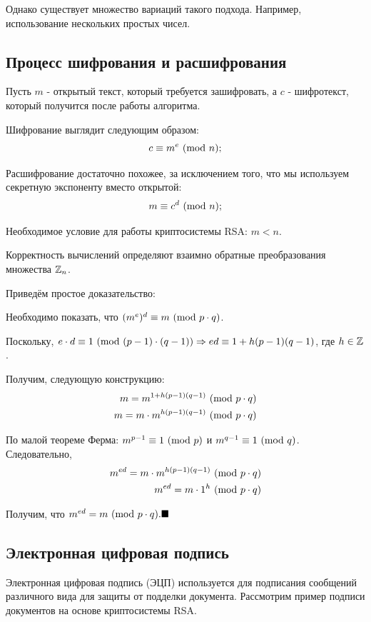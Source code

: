 Однако существует множество вариаций такого подхода. Например, использование нескольких простых чисел.

\subsection*{Процесс шифрования и расшифрования}

Пусть $m$ - открытый текст, который требуется зашифровать, а $c$ - шифротекст, который получится после работы алгоритма.

Шифрование выглядит следующим образом:
$$
c \equiv m^e \ (\mathrm{mod}\ n);
$$

Расшифрование достаточно похожее, за исключением того, что мы используем секретную экспоненту вместо открытой:
$$
m \equiv c^d \ (\mathrm{mod}\ n);
$$

Необходимое условие для работы криптосистемы RSA: $m < n$.

Корректность вычислений определяют взаимно обратные преобразования множества $\mathbb{Z}_n$.

Приведём простое доказательство:

Необходимо показать, что $(m^e)^d \equiv m \ (\mathrm{mod}\ p \cdot q)$.

Поскольку, $e \cdot d \equiv 1 \ (\mathrm{mod}\ (p-1) \cdot (q-1)) \Rightarrow ed \equiv 1 + h(p-1)(q-1)$, где $h \in \mathbb{Z}$.

Получим, следующую конструкцию:
\begin{align*}
    m = m^{1 + h(p-1)(q-1)} \ (\mathrm{mod}\ p \cdot q) \\
    m = m \cdot m^{h(p-1)(q-1)} \ (\mathrm{mod}\ p \cdot q)
\end{align*}

По малой теореме Ферма: $m^{p-1} \equiv 1 \ (\mathrm{mod}\ p)$ и $m^{q-1} \equiv 1 \ (\mathrm{mod}\ q)$. Следовательно,
\begin{align*}
    m^{ed} = m \cdot m^{h(p-1)(q-1)} \ (\mathrm{mod}\ p \cdot q) \\
    m^{ed} = m \cdot 1^h \ (\mathrm{mod}\ p \cdot q)
\end{align*}

Получим, что $m^{ed} = m \ (\mathrm{mod}\ p \cdot q). \blacksquare$


\subsection*{Электронная цифровая подпись}

Электронная цифровая подпись (ЭЦП) используется для подписания сообщений различного вида для защиты от подделки документа.
Рассмотрим пример подписи документов на основе криптосистемы RSA.

